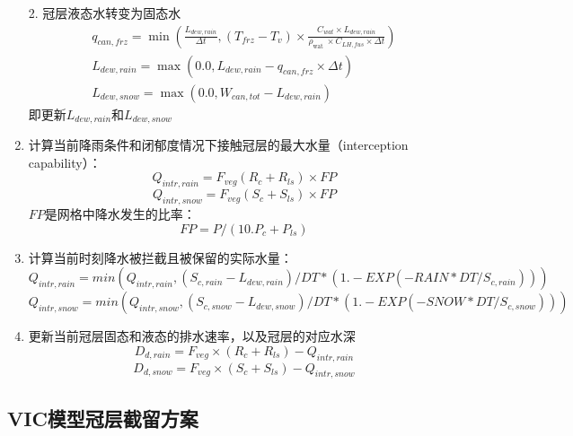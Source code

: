 \begin{enumerate}
\begin{equation}
\end{equation}
2. 冠层液态水转变为固态水
\begin{equation}
\begin{array}{c}q_{c a n, f r z}=\min \left(\frac{L_{dew,rain}}{\Delta t},\left(T_{f r z}-T_{v}\right) \times \frac{C_{w a t} \times L_{dew,rain}}{\rho_{\text {wat }} \times C_{L H, f u s} \times \Delta t}\right) \\ L_{dew,rain}=\max \left(0.0, L_{dew,rain}-q_{c a n, f r z} \times \Delta t\right) \\ L_{dew,snow}=\max \left(0.0, W_{c a n, t o t}-L_{dew,rain}\right)\end{array}
\end{equation}
即更新$L_{dew,rain}$和$L_{dew,snow}$

\item 计算当前降雨条件和闭郁度情况下接触冠层的最大水量（interception capability）：
\begin{equation}
Q_{intr,rain} =F_{veg}\left(R_{c}+R_{ls}\right)\times FP
\end{equation}
\begin{equation}
Q_{intr,snow} =F_{veg}\left(S_{c}+S_{ls}\right)\times FP
\end{equation}
$FP$是网格中降水发生的比率：
\begin{equation}
FP = P/ (10.P_{c} + P_{ls})
\end{equation}

\item 计算当前时刻降水被拦截且被保留的实际水量：
\begin{equation}
Q_{intr,rain} = min(Q_{intr,rain}, (S_{c,rain} - L_{dew,rain})/DT * (1.-EXP(-RAIN*DT/S_{c,rain})) )
\end{equation}
\begin{equation}
Q_{intr,snow} = min(Q_{intr,snow}, (S_{c,snow} - L_{dew,snow})/DT * (1.-EXP(-SNOW*DT/S_{c,snow})) )
\end{equation}
\item 更新当前冠层固态和液态的排水速率，以及冠层的对应水深
\begin{equation}
D_{d,rain}=F_{veg} \times (R_{c}+R_{ls})-Q_{intr,rain}
\end{equation}
\begin{equation}
D_{d,snow}=F_{veg} \times (S_{c}+S_{ls})-Q_{intr,snow}
\end{equation}

\end{enumerate}

\subsection{VIC模型冠层截留方案}

